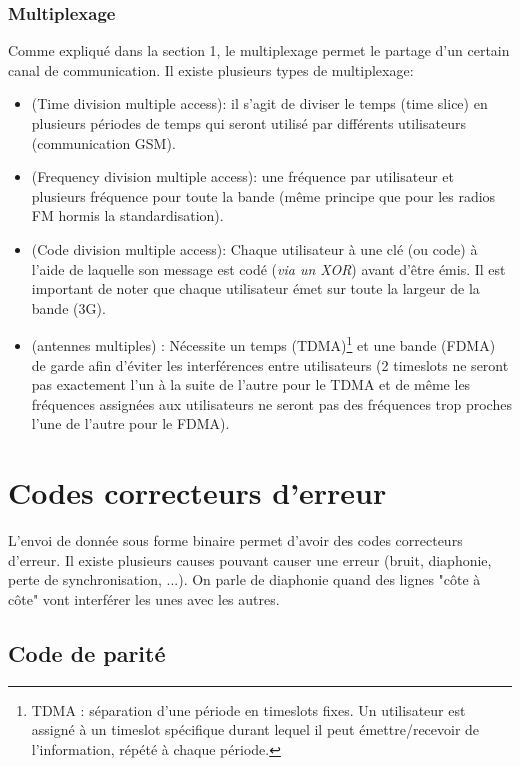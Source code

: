 \subsection{Multiplexage}

Comme expliqué dans la section 1, le multiplexage permet le partage d'un certain canal de communication. Il existe plusieurs types de multiplexage:
\begin{itemize}
\item {}(Time division multiple access): il s'agit de diviser le temps (time slice) en plusieurs périodes de temps qui seront utilisé par différents utilisateurs (communication GSM).
\item {}(Frequency division multiple access): une fréquence par utilisateur et plusieurs fréquence pour toute la bande (même principe que pour les radios FM hormis la standardisation).
\item {}(Code division multiple access): Chaque utilisateur à une clé (ou code) à l'aide de laquelle son message est codé (\textit{via un XOR}) avant d'être émis. Il est important de noter que chaque utilisateur émet sur toute la largeur de la bande (3G).
\item {}(antennes multiples) : Nécessite un temps (TDMA)\footnote{TDMA : séparation d'une période en timeslots fixes. Un utilisateur est assigné à un timeslot spécifique durant lequel il peut émettre/recevoir de l'information, répété à chaque période.} et une bande (FDMA) de garde afin d'éviter les interférences entre utilisateurs (2 timeslots ne seront pas exactement l'un à la suite de l'autre pour le TDMA et de même les fréquences assignées aux utilisateurs ne seront pas des fréquences trop proches l'une de l'autre pour le FDMA).
\end{itemize}

\chapter{Codes correcteurs d'erreur}

L'envoi de donnée sous forme binaire permet d'avoir des codes correcteurs d'erreur. Il existe plusieurs causes pouvant causer une erreur (bruit, diaphonie, perte de synchronisation, ...). On parle de diaphonie quand des lignes "côte à côte" vont interférer les unes avec les autres.

\section{Code de parité}

